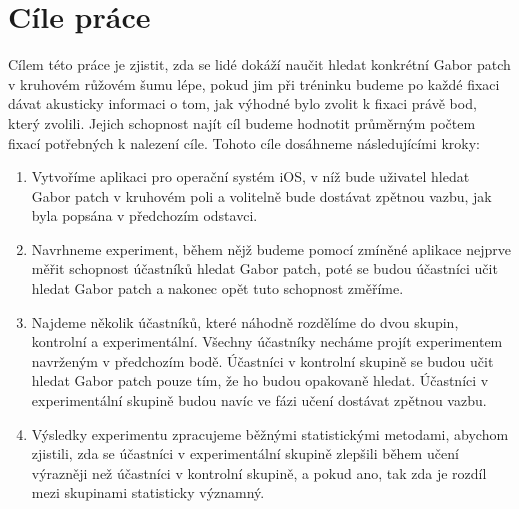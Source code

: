 \chapter{Cíle práce}

Cílem této práce je zjistit, zda se lidé dokáží naučit hledat konkrétní Gabor
patch v kruhovém růžovém šumu lépe, pokud jim při tréninku budeme po každé
fixaci dávat akusticky informaci o tom, jak výhodné bylo zvolit k fixaci
právě bod, který zvolili. Jejich schopnost najít cíl budeme hodnotit
průměrným počtem fixací potřebných k nalezení cíle. Tohoto cíle dosáhneme
následujícími kroky:

\begin{enumerate}

\item Vytvoříme aplikaci pro operační systém iOS, v níž bude uživatel hledat
Gabor patch v kruhovém poli a volitelně bude dostávat zpětnou vazbu, jak byla
popsána v předchozím odstavci.

\item Navrhneme experiment, během nějž budeme pomocí zmíněné aplikace nejprve
měřit schopnost účastníků hledat Gabor patch, poté se budou účastníci učit
hledat Gabor patch a nakonec opět tuto schopnost změříme.

\item Najdeme několik účastníků, které náhodně rozdělíme do dvou skupin,
kontrolní a experimentální. Všechny účastníky necháme projít experimentem
navrženým v předchozím bodě. Účastníci v kontrolní skupině se budou učit hledat
Gabor patch pouze tím, že ho budou opakovaně hledat. Účastníci v experimentální
skupině budou navíc ve fázi učení dostávat zpětnou vazbu.

\item Výsledky experimentu zpracujeme běžnými statistickými metodami, aby\-chom
zjistili, zda se účastníci v experimentální skupině zlepšili během učení výrazněji
než účastníci v kontrolní skupině, a pokud ano, tak zda je rozdíl mezi
skupinami statisticky významný.

\end{enumerate} 
